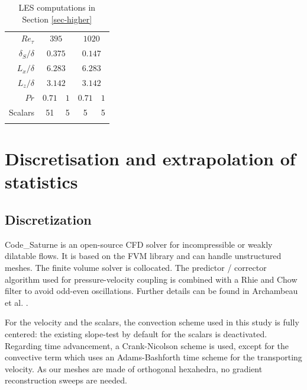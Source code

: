 \documentclass{svjour3}                     %
\begin{document}
\begin{table}
\caption{LES computations in Section \ref{sec-higher}}
\label{tab-higher-geo}
\begin{tabular}{r|cc|cc|}%
\hline\noalign{\smallskip}
$Re_\tau$ & \multicolumn{2}{|c|}{$395$} & \multicolumn{2}{|c|}{$1020$} \\%
${\delta_S}/{\delta}$ & \multicolumn{2}{|c|}{$0.375$} & \multicolumn{2}{|c|}{$0.147$} \\%
${L_x}/{\delta}$ & \multicolumn{2}{|c|}{$6.283$} & \multicolumn{2}{|c|}{$6.283$} \\%
${L_z}/{\delta}$ & \multicolumn{2}{|c|}{$3.142$} & \multicolumn{2}{|c|}{$3.142$} \\%
$Pr$ & $0.71$ & $1$ & $0.71$ & $1$ \\%
Scalars & 51 & 5 & 5 & 5 \\%
\noalign{\smallskip}\hline
\end{tabular}
\end{table}

\section{Discretisation and extrapolation of statistics}
\label{sec-discret}

\subsection{Discretization}
\label{subsec-discet}

{\selectfont Code\_Saturne} is an open-source CFD solver for incompressible or weakly dilatable flows.
It is based on the FVM library and can handle unstructured meshes.
The finite volume solver is collocated.
The predictor / corrector algorithm used for pressure-velocity coupling is combined with a Rhie and Chow filter to avoid odd-even oscillations.
Further details can be found in Archambeau et al. \cite{archambeau2004code}.

For the velocity and the scalars, the convection scheme used in this study is fully centered: the existing slope-test by default for the scalars is deactivated.
Regarding time advancement, a Crank-Nicolson scheme is used, except for the convective term which uses an Adams-Bashforth time scheme for the transporting velocity.
As our meshes are made of orthogonal hexahedra, no gradient reconstruction sweeps are needed.
\end{document}
